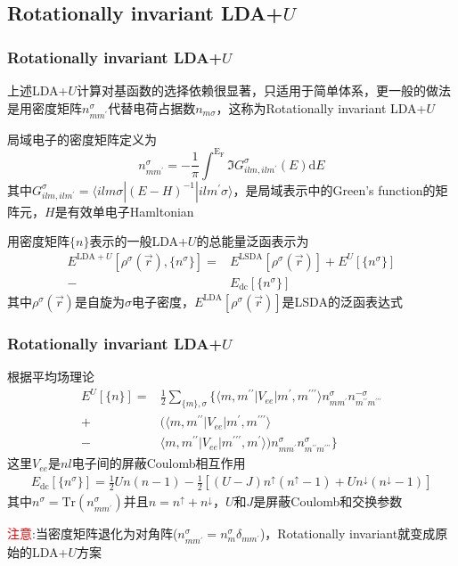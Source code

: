 \subsection{\rm{Rotationally invariant LDA+}$U$}
\frame
{
	\frametitle{\textrm{Rotationally invariant LDA+}$U$}
	上述\textrm{LDA}+$U$计算对基函数的选择依赖很显著，只适用于简单体系，更一般的做法是用密度矩阵$n_{mm^{\prime}}^{\sigma}$代替电荷占据数$n_{m\sigma}$，这称为\textrm{Rotationally invariant LDA}+$U$

局域电子的密度矩阵定义为
\begin{displaymath}
	n_{mm^{\prime}}^{\sigma}=-\frac1{\pi}\int^{\mathrm{E_F}}\Im G_{ilm,ilm^{\prime}}^{\sigma}(E)\mathrm{d}E
\end{displaymath}
其中$G_{ilm,ilm^{\prime}}^{\sigma}=\langle ilm\sigma|(E-H)^{-1}|ilm^{\prime}\sigma\rangle$，是局域表示中的\textrm{Green's function}的矩阵元，$H$是有效单电子\textrm{Hamltonian}

用密度矩阵$\{n\}$表示的一般\textrm{LDA+}$U$的总能量泛函表示为
\begin{displaymath}
	\begin{aligned}
		E^{\mathrm{LDA}+U}[\rho^{\sigma}(\vec r),\{n^{\sigma}\}]=&E^{\mathrm{LSDA}}[\rho^{\sigma}(\vec r)]+E^U[\{n^{\sigma}\}]\\
		-&E_{\mathrm{dc}}[\{n^{\sigma}\}]
	\end{aligned}
\end{displaymath}
其中$\rho^{\sigma}(\vec r)$是自旋为$\sigma$电子密度，$E^{\mathrm{LDA}}[\rho^{\sigma}(\vec r)]$是\textrm{LSDA}的泛函表达式
}

\frame
{
	\frametitle{\textrm{Rotationally invariant LDA+}$U$}
	根据平均场理论
	\begin{displaymath}
		\begin{aligned}
			E^U[\{n\}]=&\frac12\sum_{\{m\},\sigma}\{\langle m,m^{\prime\prime}|V_{ee}|m^{\prime},m^{\prime\prime\prime}\rangle n_{mm^{\prime}}^{\sigma}n_{m^{\prime\prime}m^{\prime\prime\prime}}^{-\sigma}\\
			+&(\langle m,m^{\prime\prime}|V_{ee}|m^{\prime},m^{\prime\prime\prime}\rangle\\
			-&\langle m,m^{\prime\prime}|V_{ee}|m^{\prime\prime\prime},m^{\prime}\rangle)n_{mm^{\prime}}^{\sigma}n_{m^{\prime\prime}m^{\prime\prime\prime}}^{\sigma}\}
		\end{aligned}
	\end{displaymath}
	这里$V_{ee}$是$nl$电子间的屏蔽\textrm{Coulomb}相互作用
\begin{displaymath}
	\begin{aligned}
		E_{\mathrm{dc}}[\{n^{\sigma}\}]=\frac12Un(n-1)-\frac12[(U-J)n^{\uparrow}(n^{\uparrow}-1)+Un^{\downarrow}(n^{\downarrow}-1)]
	\end{aligned}
\end{displaymath}
其中$n^{\sigma}=\mathrm{Tr}(n_{mm^{\prime}}^{\sigma})$并且$n=n^{\uparrow}+n^{\downarrow}$，$U$和$J$是屏蔽\textrm{Coulomb}和交换参数

\textcolor{red}{注意}:当密度矩阵退化为对角阵($n_{mm^{\prime}}^{\sigma}=n_m^{\sigma}\delta_{mm^{\prime}}$)，\textrm{Rotationally invariant}就变成原始的\textrm{LDA}+$U$方案
}

